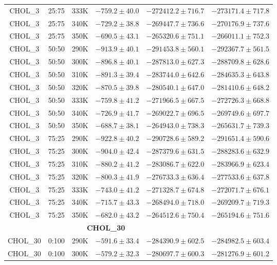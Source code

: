 \begin{longtable}{|c|c|c|c|c|c|}
CHOL\_3 & 25:75 & 333K & $-759.2 \pm 40.0$ & $-272412.2 \pm 716.7$ & $-273171.4 \pm 717.8$ \\
CHOL\_3 & 25:75 & 340K & $-729.2 \pm 38.8$ & $-269447.7 \pm 736.6$ & $-270176.9 \pm 737.6$ \\
CHOL\_3 & 25:75 & 350K & $-690.5 \pm 43.1$ & $-265320.6 \pm 751.1$ & $-266011.1 \pm 752.3$ \\
CHOL\_3 & 50:50 & 290K & $-913.9 \pm 40.1$ & $-291453.8 \pm 560.1$ & $-292367.7 \pm 561.5$ \\
CHOL\_3 & 50:50 & 300K & $-896.8 \pm 40.1$ & $-287813.0 \pm 627.3$ & $-288709.8 \pm 628.6$ \\
CHOL\_3 & 50:50 & 310K & $-891.3 \pm 39.4$ & $-283744.0 \pm 642.6$ & $-284635.3 \pm 643.8$ \\
CHOL\_3 & 50:50 & 320K & $-870.5 \pm 39.8$ & $-280540.1 \pm 647.0$ & $-281410.6 \pm 648.2$ \\
CHOL\_3 & 50:50 & 333K & $-759.8 \pm 41.2$ & $-271966.5 \pm 667.5$ & $-272726.3 \pm 668.8$ \\
CHOL\_3 & 50:50 & 340K & $-726.9 \pm 41.7$ & $-269022.7 \pm 696.5$ & $-269749.6 \pm 697.7$ \\
CHOL\_3 & 50:50 & 350K & $-688.7 \pm 38.1$ & $-264943.0 \pm 738.3$ & $-265631.7 \pm 739.3$ \\
CHOL\_3 & 75:25 & 290K & $-922.8 \pm 40.2$ & $-290728.6 \pm 589.2$ & $-291651.4 \pm 590.6$ \\
CHOL\_3 & 75:25 & 300K & $-904.0 \pm 42.4$ & $-287379.6 \pm 631.5$ & $-288283.6 \pm 632.9$ \\
CHOL\_3 & 75:25 & 310K & $-880.2 \pm 41.2$ & $-283086.7 \pm 622.0$ & $-283966.9 \pm 623.4$ \\
CHOL\_3 & 75:25 & 320K & $-800.3 \pm 41.9$ & $-276733.3 \pm 636.4$ & $-277533.6 \pm 637.8$ \\
CHOL\_3 & 75:25 & 333K & $-743.0 \pm 41.2$ & $-271328.7 \pm 674.8$ & $-272071.7 \pm 676.1$ \\
CHOL\_3 & 75:25 & 340K & $-715.7 \pm 43.3$ & $-268494.0 \pm 718.0$ & $-269209.7 \pm 719.3$ \\
CHOL\_3 & 75:25 & 350K & $-682.0 \pm 43.2$ & $-264512.6 \pm 750.4$ & $-265194.6 \pm 751.6$ \\
\midrule \multicolumn{5}{c}{\textbf{CHOL\_30}} \\ \midrule
CHOL\_30 & 0:100 & 290K & $-591.6 \pm 33.4$ & $-284390.9 \pm 602.5$ & $-284982.5 \pm 603.4$ \\
CHOL\_30 & 0:100 & 300K & $-579.2 \pm 32.3$ & $-280697.7 \pm 600.3$ & $-281276.9 \pm 601.2$ \\

\end{longtable}
